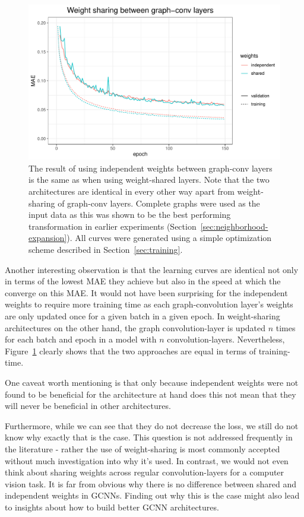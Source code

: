 \begin{figure}[H]
	\includegraphics[width=\linewidth]{figures/weight-sharing.pdf}
	\caption{The result of using independent weights between graph-conv layers is the same as when using weight-shared layers. Note that the two architectures are identical in every other way apart from weight-sharing of graph-conv layers. Complete graphs were used as the input data as this was shown to be the best performing transformation in earlier experiments (Section~\ref{sec:neighborhood-expansion}). All curves were generated using a simple optimization scheme described in Section~\ref{sec:training}.}
	\label{fig:weight-sharing}
\end{figure}


Another interesting observation is that the learning curves are identical not only in terms of the lowest MAE they achieve but also in the speed at which the converge on this MAE. It would not have been surprising for the independent weights to require more training time as each graph-convolution layer's weights are only updated once for a given batch in a given epoch. In weight-sharing architectures on the other hand, the graph convolution-layer is updated $n$ times for each batch and epoch in a model with $n$ convolution-layers. Nevertheless, Figure~\ref{fig:weight-sharing} clearly shows that the two approaches are equal in terms of training-time.

One caveat worth mentioning is that only because independent weights were not found to be beneficial for the architecture at hand does this not mean that they will never be beneficial in other architectures.

Furthermore, while we can see that they do not decrease the loss, we still do not know why exactly that is the case. This question is not addressed frequently in the literature - rather the use of weight-sharing is most commonly accepted without much investigation into why it's used. In contrast, we would not even think about sharing weights across regular convolution-layers for a computer vision task. It is far from obvious why there is no difference between shared and independent weights in GCNNs. Finding out why this is the case might also lead to insights about how to build better GCNN architectures.  

